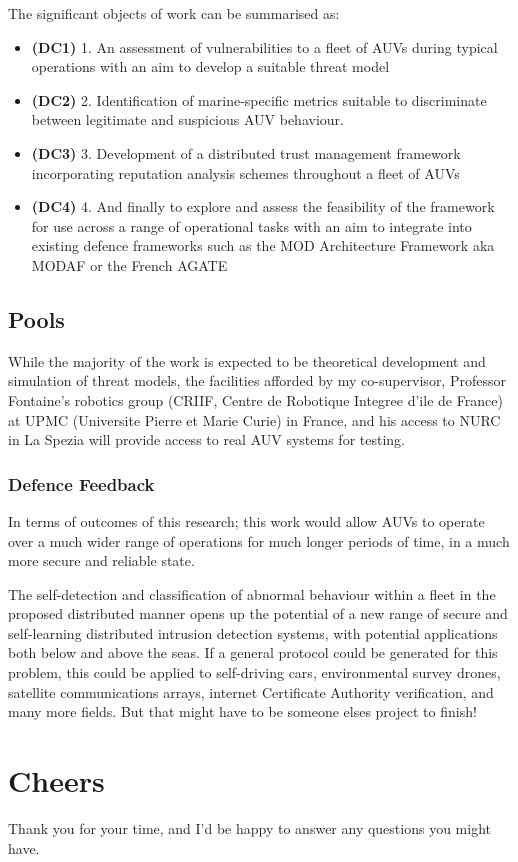 \documentclass[oneside,11pt,a4paper]{Latex/Classes/PhDthesisPSnPDF}
\begin{document}
\begin{doublespace}
The significant objects of work can be summarised as: 
\begin{itemize}
	\item\textbf{(DC1)}  1. An assessment of vulnerabilities to a fleet of AUVs
	during typical operations with an aim to develop a suitable threat model
	\item\textbf{(DC2)}  2. Identification of marine-specific metrics 
  suitable to discriminate between legitimate and suspicious AUV behaviour.
	\item\textbf{(DC3)}  3. Development of a distributed trust management framework
	incorporating reputation analysis schemes throughout a fleet of AUVs
	\item\textbf{(DC4)}  4. And finally to explore and assess the feasibility of
	the framework for use across a range of operational tasks with an aim to integrate
  into existing defence frameworks such as the MOD Architecture Framework aka	
  MODAF or the French AGATE
\end{itemize}

\subsection{Pools}  While the majority of the work is expected to be
theoretical development and simulation of threat models, the facilities afforded
by my co-supervisor, Professor Fontaine's robotics group (CRIIF, Centre de
Robotique Integree d'ile de France) at UPMC (Universite Pierre et Marie Curie)
in France, and his access to NURC in La Spezia will provide access to real AUV 
systems for testing.

\subsubsection{Defence Feedback}  In terms of outcomes of this research; this
work would allow AUVs to operate over a much wider
range of operations for much longer periods of time, in a much more secure and
reliable state.

The self-detection and classification of abnormal behaviour within a fleet in
the proposed distributed manner opens up the potential of a new range of secure
and self-learning distributed intrusion detection systems, with potential
applications both below and above the seas. If a general protocol could be
generated for this problem, this could be applied to self-driving cars,
environmental survey drones, satellite communications arrays,
internet Certificate Authority verification, and many more fields. But that
might have to be someone elses project to finish!

\section{Cheers}  Thank you for your time, and I'd be happy to answer any questions
you might have.
\end{doublespace}
\end{document}
